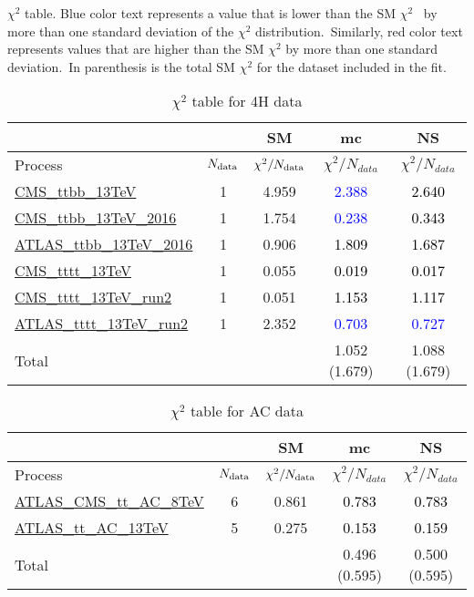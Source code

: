 \documentclass{article}
\begin{document}
$\chi^2$ table. Blue color text represents a value that is lower than the SM $\chi^2$ \
            by more than one standard deviation of the $\chi^2$ distribution.\
            Similarly, red color text represents values that are higher than the SM $\chi^2$ by more than one standard deviation.\
            In parenthesis is the total SM $\chi^2$ for the dataset included in the fit. \\
\begin{table}[H]
\centering
\begin{tabular}{|l|c|c|c|c|}
\hline
 \multicolumn{2}{|c|}{} & SM& mc& NS\\ \hline
Process & $N_{\rm data}$ & $\chi^ 2/N_{\rm data}$& $\chi^ 2/N_{data}$& $\chi^ 2/N_{data}$\\ \hline
\href{https://arxiv.org/abs/1705.10141}{CMS_ttbb_13TeV} & 1 & 4.959 & \textcolor{blue}{2.388} & \textcolor{black}{2.640} \\ \hline
\href{https://arxiv.org/abs/1909.05306}{CMS_ttbb_13TeV_2016} & 1 & 1.754 & \textcolor{blue}{0.238} & \textcolor{black}{0.343} \\ \hline
\href{https://arxiv.org/abs/1811.12113}{ATLAS_ttbb_13TeV_2016} & 1 & 0.906 & \textcolor{black}{1.809} & \textcolor{black}{1.687} \\ \hline
\href{https://arxiv.org/abs/1710.10614}{CMS_tttt_13TeV} & 1 & 0.055 & \textcolor{black}{0.019} & \textcolor{black}{0.017} \\ \hline
\href{https://arxiv.org/abs/1908.06463}{CMS_tttt_13TeV_run2} & 1 & 0.051 & \textcolor{black}{1.153} & \textcolor{black}{1.117} \\ \hline
\href{https://arxiv.org/abs/2007.14858}{ATLAS_tttt_13TeV_run2} & 1 & 2.352 & \textcolor{blue}{0.703} & \textcolor{blue}{0.727} \\ \hline
\hline Total & &  & 1.052 (1.679) & 1.088 (1.679) \\ \hline
\end{tabular}
\caption{$\chi^2$ table for 4H data}
\end{table}
\begin{table}[H]
\centering
\begin{tabular}{|l|c|c|c|c|}
\hline
 \multicolumn{2}{|c|}{} & SM& mc& NS\\ \hline
Process & $N_{\rm data}$ & $\chi^ 2/N_{\rm data}$& $\chi^ 2/N_{data}$& $\chi^ 2/N_{data}$\\ \hline
\href{https://arxiv.org/abs/1709.05327}{ATLAS_CMS_tt_AC_8TeV} & 6 & 0.861 & \textcolor{black}{0.783} & \textcolor{black}{0.783} \\ \hline
\href{https://cds.cern.ch/record/2682109}{ATLAS_tt_AC_13TeV} & 5 & 0.275 & \textcolor{black}{0.153} & \textcolor{black}{0.159} \\ \hline
\hline Total & &  & 0.496 (0.595) & 0.500 (0.595) \\ \hline
\end{tabular}
\caption{$\chi^2$ table for AC data}
\end{table}
\end{document}

